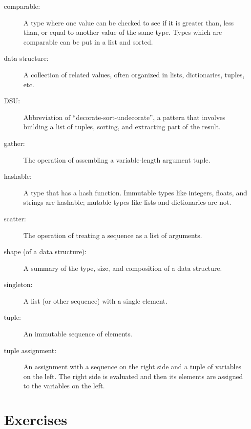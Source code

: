 \begin{description}

\item[comparable:] A type where one value can be checked to see if it is
greater than, less than, or equal to another value of the same type.
Types which are comparable can be put in a list and sorted.

\item[data structure:] A collection of related values, often
organized in lists, dictionaries, tuples, etc.

\item[DSU:] Abbreviation of ``decorate-sort-undecorate'', a
pattern that involves building a list of tuples, sorting, and
extracting part of the result.

\item[gather:] The operation of assembling a variable-length
argument tuple.

\item[hashable:] A type that has a hash function.  Immutable
types like integers,
floats, and strings are hashable; mutable types like lists and
dictionaries are not.

\item[scatter:] The operation of treating a sequence as a list of
arguments.

\item[shape (of a data structure):] A summary of the type,
size, and composition of a data structure.

\item[singleton:] A list (or other sequence) with a single element.

\item[tuple:] An immutable sequence of elements.

\item[tuple assignment:] An assignment with a sequence on the
right side and a tuple of variables on the left.  The right
side is evaluated and then its elements are assigned to the
variables on the left.

\end{description}


\section{Exercises}

